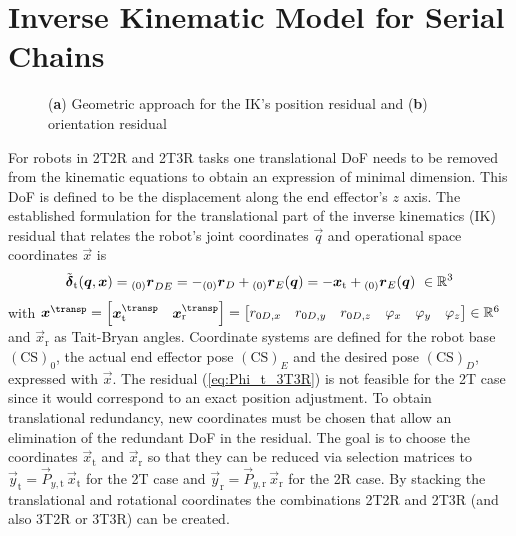 \documentclass[graybox,vecphys]{svmult}
\newcommand{\ks}[1]{{(\mathrm{CS})_{#1}}}
\newcommand{\ortvek}[4]{{ }_{(#1)}{\boldsymbol{#2}}^{#3}_{#4} }
\newcommand{\Res}[0]{\vec{\delta}}
\begin{document}
\section{Inverse Kinematic Model for Serial Chains} %
\label{sec:model}

\begin{figure}[b]
\vspace{-0.3cm}
\centering

\vspace{-0.3cm}
\caption{(\textbf{a}) Geometric approach for the IK's position residual and (\textbf{b}) orientation residual}
\label{fig:geometry_sketch}
\end{figure}

For robots in 2T2R and 2T3R tasks one translational DoF needs to be removed from the kinematic equations to obtain an expression of minimal dimension. 
This DoF is defined to be the displacement along the end effector's $z$ axis.
% 
The established formulation for the translational part of the inverse kinematics (IK) residual that relates the robot's joint coordinates $\vec{q}$ and operational space coordinates $\vec{x}$ is
%
\vspace{-0.1cm}
\begin{equation}
\label{eq:Phi_t_3T3R}
{\tilde{\Res}_\mathrm{t}(\vec{q},\vec{x})} 
= 
\ortvek{0}{r}{}{DE}
=
-{_{(0)}\vec{r}_D} + {_{(0)}\vec{r}_E}(\vec{q}) = -\vec{x}_{\mathrm{t}} + {_{(0)}\vec{r}_E}(\vec{q}) ~\in {\mathbb{R}}^{3}
\vspace{-0.1cm}
\end{equation}
%
with $\vec{x}^\transp
=
\begin{bmatrix}
\vec{x}_{\mathrm{t}}^\transp & 
\vec{x}_{\mathrm{r}}^\transp
\end{bmatrix}
= 
\begin{bmatrix}
r_{0D,x} & 
r_{0D,y} & 
r_{0D,z} & 
\varphi_x &
\varphi_y &
\varphi_z
\end{bmatrix}
\in {\mathbb{R}}^{6}$ and $\vec{x}_{\mathrm{r}}$ as Tait-Bryan angles.
% 
Coordinate systems are defined for the robot base $\ks{0}$, the actual end effector pose $\ks{E}$ and the desired pose $\ks{D}$, expressed with $\vec{x}$.
The residual (\ref{eq:Phi_t_3T3R}) is not feasible for the 2T case since it would correspond to an exact position adjustment.
To obtain translational redundancy, new coordinates must be chosen that allow an elimination of the redundant DoF in the residual.
The goal is to choose the coordinates $\vec{x}_\mathrm{t}$ and $\vec{x}_\mathrm{r}$ so that they can be reduced via selection matrices to 
$
\vec{y}_{\mathrm{t}}
=
\vec{P}_{y,\mathrm{t}}\,\vec{x}_{\mathrm{t}}$
for the 2T case and
$
\vec{y}_{\mathrm{r}}
=
\vec{P}_{y,\mathrm{r}}\,\vec{x}_{\mathrm{r}}
$
for the 2R case.
%
By stacking the translational and rotational coordinates the combinations 2T2R and 2T3R (and also 3T2R or 3T3R) can be created. 
\end{document}
